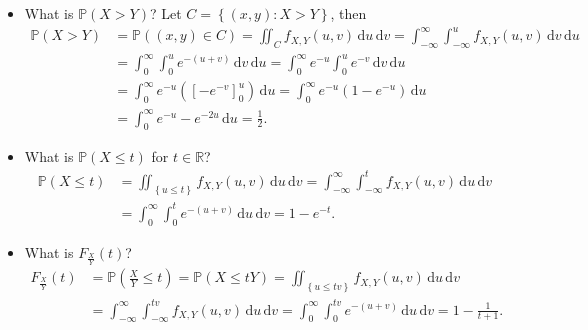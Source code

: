 \begin{explanation}
    \hfill 
    \begin{itemize}
        \item [(a)] What is \(\mathbb{P} (X > Y)\)? Let \(C = \left\{ (x, y): X > Y \right\} \), then 
        \begin{align*}
            \mathbb{P} (X > Y) &= \mathbb{P} ((x, y) \in C) = \iint_C f_{X, Y}(u, v) \, \mathrm{d} u \, \mathrm{d} v = \int _{-\infty }^{\infty } \int _{-\infty }^u f_{X, Y} (u, v) \, \mathrm{d} v \, \mathrm{d} u \\
            &= \int _0^{\infty } \int _0^u e^{-(u+v)} \, \mathrm{d} v \, \mathrm{d} u = \int _0^{\infty } e^{-u} \int _0^u e^{-v} \, \mathrm{d} v \, \mathrm{d} u \\
            &= \int _0^{\infty } e^{-u} \left( \left[ -e^{-v} \right]_0^u  \right) \, \mathrm{d} u = \int _0^{\infty} e^{-u} \left( 1 - e^{-u} \right) \, \mathrm{d} u \\
            &= \int _0^{\infty} e^{-u} - e^{-2 u} \, \mathrm{d} u = \frac{1}{2}.          
        \end{align*}
        \item [(b)] What is \(\mathbb{P} (X \le t)\) for \(t \in \mathbb{R}\)? 
        \begin{align*}
            \mathbb{P} (X \le t) &= \iint_{\left\{ u \le t \right\} } f_{X, Y}(u, v) \, \mathrm{d} u \, \mathrm{d} v = \int _{-\infty }^{\infty} \int _{-\infty }^t f_{X, Y}(u, v) \, \mathrm{d} u \, \mathrm{d} v \\
            &= \int _0^{\infty} \int _0^t e^{-(u + v)} \, \mathrm{d} u \, \mathrm{d} v = 1 - e^{-t}.    
        \end{align*}
        \item [(c)] What is \(F_{\frac{X}{Y}} (t)\)? 
        \begin{align*}
            F_{\frac{X}{Y}}(t) &= \mathbb{P} \left( \frac{X}{Y} \le t \right) = \mathbb{P} (X \le tY) = \iint_{\left\{ u \le tv \right\} } f_{X, Y} (u, v) \, \mathrm{d} u \, \mathrm{d} v \\
            &= \int_{-\infty }^{\infty} \int _{-\infty }^{tv} f_{X, Y}(u, v) \, \mathrm{d} u \, \mathrm{d} v = \int_{0}^{\infty} \int _{0}^{tv} e^{-(u + v)} \, \mathrm{d} u \, \mathrm{d} v = 1 - \frac{1}{t+1}.    
        \end{align*}
    \end{itemize}
\end{explanation}